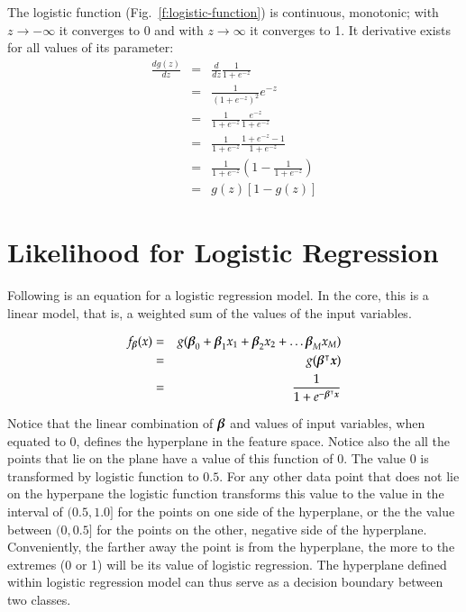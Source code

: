 \begin{refsection}
The logistic function (Fig.~\ref{f:logistic-function}) is continuous, monotonic; with $z\to -\infty$ it converges to 0 and with $z\to\infty$ it converges to 1. It derivative exists for all values of its parameter:
\begin{eqnarray}
  \frac{dg(z)}{dz} & = & \frac{d}{dz} \frac{1}{1+e^{-z}} \nonumber \\
  & = & \frac{1}{(1+e^{-z})^2} e^{-z} \nonumber \\
  & = & \frac{1}{1+e^{-z}}\frac{e^{-z}}{1+e^{-z}} \nonumber \\
  & = & \frac{1}{1+e^{-z}}\frac{1+e^{-z}-1}{1+e^{-z}} \nonumber \\
  & = & \frac{1}{1+e^{-z}}\left(1-\frac{1}{1+e^{-z}}\right) \nonumber \\
  & = & g(z)[1-g(z)]
\end{eqnarray}

\section{Likelihood for Logistic Regression}

Following is an equation for a logistic regression model. In the core, this is a linear model, that is, a weighted sum of the values of the input variables. 

\begin{eqnarray}
  f_{\boldsymbol{\beta}}(x) & = & g(\boldsymbol{\beta}_0+\boldsymbol{\beta}_1 x_1+\boldsymbol{\beta}_2 x_2+\ldots\boldsymbol{\beta}_M x_M)
  \nonumber \\
  & = & g(\boldsymbol{\beta}^\intercal \boldsymbol{x}) \nonumber \\
  & = & \frac{1}{1+e^{-\boldsymbol{\beta}^\intercal \boldsymbol{x}}}
  \label{eq:logreg}
\end{eqnarray}

Notice that the linear combination of $\boldsymbol{\beta}$ and values of input variables, when equated to $0$, defines the hyperplane in the feature space. Notice also the all the points that lie on the plane have a value of this function of $0$. The value $0$ is transformed by logistic function to $0.5$. For any other data point that does not lie on the hyperpane the logistic function transforms this value to the value in the interval of $(0.5, 1.0]$ for the points on one side of the hyperplane, or the the value between $(0, 0.5]$ for the points on the other, negative side of the hyperplane. Conveniently, the farther away the point is from the hyperplane, the more to the extremes (0 or 1) will be its value of logistic regression. The hyperplane defined within logistic regression model can thus serve as a decision boundary between two classes.


\end{refsection}
